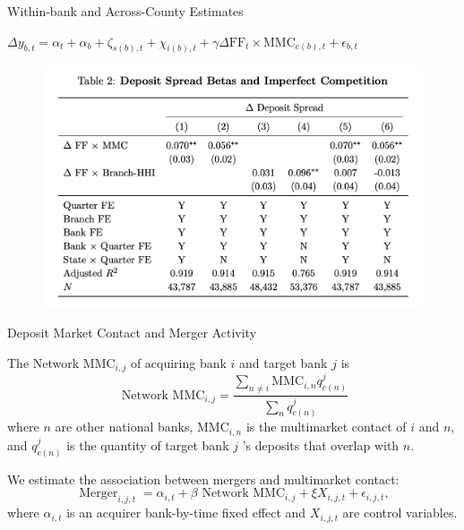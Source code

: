\documentclass[notes,10.2pt, aspectratio=169]{beamer}
\newenvironment{wideitemize}{\itemize\addtolength{\itemsep}{10pt}}{\enditemize}
\begin{document}
\begin{frame}{Within-bank and Across-County Estimates}
  \vspace{0.1cm}
  \begin{wideitemize}
  \item $\Delta y_{b, t}=\alpha_t+\alpha_b+\zeta_{s(b), t}+\chi_{i(b), t}+\gamma \Delta \mathrm{FF}_t \times \mathrm{MMC}_{c(b), t}+\epsilon_{b, t}$
  

\begin{figure}[t*]
  \centering
  \includegraphics[width=.68\textwidth]{./imgs/table2.png}
\end{figure}

\end{wideitemize}

\end{frame}


\begin{frame}{Deposit Market Contact and Merger Activity}
  \vspace{0.1cm}
  \begin{wideitemize}
  \item The Network $\mathrm{MMC}_{i, j}$ of acquiring bank $i$ and target bank $j$ is
  $$
  \text { Network } \mathrm{MMC}_{i, j}=\frac{\sum_{n \neq i} \mathrm{MMC}_{i, n} q_{c(n)}^j}{\sum_n q_{c(n)}^j}
  $$
  where $n$ are other national banks,  $\mathrm{MMC}_{i, n}$ is the multimarket contact of $i$  and $n$, and $q_{c(n)}^j$ is the quantity of target bank $j$ 's deposits that overlap with $n$. 

  \item We estimate the association between mergers and multimarket contact:
  $$
  \operatorname{Merger}_{i, j, t}=\alpha_{i, t}+\beta \text { Network } \mathrm{MMC}_{i, j}+\xi X_{i, j, t}+\epsilon_{i, j, t},
  $$
  where $\alpha_{i, t}$ is an acquirer bank-by-time fixed effect and $X_{i, j, t}$ are control variables.


\end{wideitemize}
\end{frame}
\end{document}

